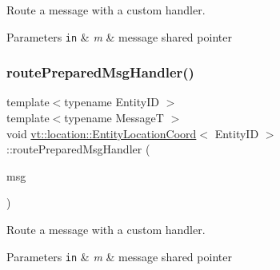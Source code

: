 Route a message with a custom handler. 


\begin{DoxyParams}[1]{Parameters}
\mbox{\tt in}  & {\em m} & message shared pointer \\
\hline
\end{DoxyParams}
\mbox{\label{structvt_1_1location_1_1_entity_location_coord_a110012758ba721c4ecf2816764fc799e}} 
\subsubsection{\texorpdfstring{route\+Prepared\+Msg\+Handler()}{routePreparedMsgHandler()}}
{\footnotesize\ttfamily template$<$typename Entity\+ID $>$ \\
template$<$typename MessageT $>$ \\
void \hyperlink{structvt_1_1location_1_1_entity_location_coord}{vt\+::location\+::\+Entity\+Location\+Coord}$<$ Entity\+ID $>$\+::route\+Prepared\+Msg\+Handler (\begin{DoxyParamCaption}\item[{\hyperlink{namespacevt_ab2b3d506ec8e8d1540aede826d84a239}{Msg\+Shared\+Ptr}$<$ MessageT $>$ const \&}]{msg }\end{DoxyParamCaption})}



Route a message with a custom handler. 


\begin{DoxyParams}[1]{Parameters}
\mbox{\tt in}  & {\em m} & message shared pointer \\
\hline
\end{DoxyParams}
\mbox{\label{structvt_1_1location_1_1_entity_location_coord_a9903f0c4581b9d8a231293e98cf9a11c}} 
